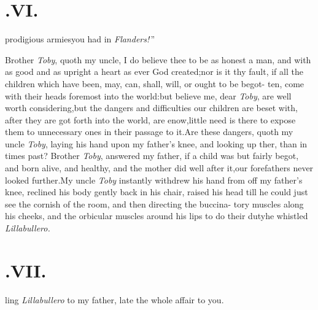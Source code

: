 \documentclass{article}
\begin{document}
\section{.\quad  VI.}

prodigious armies\break you had in \textit{Flanders!}\,”

\tsh Brother \textit{Toby}, quoth my uncle\sic, I\break
do believe thee to be as honest a man,\break
and with as good and as upright a heart\break
as ever God created;\tsh nor is it thy\break
fault, if all the children which have been,\break
may, can, shall, will, or ought to be begot-\break
ten, come with their heads foremost into\break
the world:\tsh but believe me, dear \textit{Toby},\break
{}
are well worth considering,\tsh but the dangers and difficulties
our children are beset with, after they are got forth into the
world, are enow,\tsk little need is there to expose them to
unnecessary ones in their passage to it.\tsk Are these dangers,
quoth my uncle \textit{Toby}, laying his hand upon my father’s
knee, and looking up   ther, than in times past? Brother \textit{Toby}, answered
my father, if a child was but fairly begot, and born alive, and
healthy, and the mother did well after it,\tsk our forefathers
never looked further.\tsh My uncle \textit{Toby} instantly
withdrew his hand from off my father’s knee, reclined his body
gently back in his chair, raised his head till he could just see
the cornish of the room, and then directing the
buccina-\break
tory muscles along his cheeks, and the 
orbicular muscles around his lips to do their duty\tsk he
whistled \textit{Lillabullero.}

\section{.\quad  VII.}

 \break
ling \textit{Lillabullero} to my father,\tsk\break 
{}
late the whole affair to you.
\end{document}
